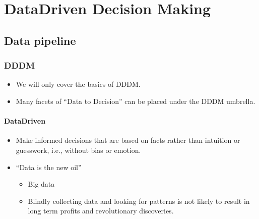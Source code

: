 \documentclass[letterpaper,10pt,english]{jupyterBook}
\begin{document}
\sphinxstepscope


\part{Data\sphinxhyphen{}Driven Decision Making}

\sphinxstepscope


\chapter{Data pipeline}
\label{\detokenize{1_Decision_making/Data_pipeline:data-pipeline}}\label{\detokenize{1_Decision_making/Data_pipeline::doc}}
\sphinxstepscope


\section{DDDM}
\label{\detokenize{1_Decision_making/Decision_making:dddm}}\label{\detokenize{1_Decision_making/Decision_making::doc}}\begin{itemize}
\item {} 
\sphinxAtStartPar
We will only cover the basics of DDDM.

\item {} 
\sphinxAtStartPar
Many facets of “Data to Decision” can be placed under the DDDM umbrella.

\end{itemize}


\subsection{Data\sphinxhyphen{}Driven}
\label{\detokenize{1_Decision_making/Decision_making:data-driven}}\begin{itemize}
\item {} 
\sphinxAtStartPar
Make informed decisions that are based on facts rather than intuition or guesswork, i.e., without bias or emotion.

\item {} 
\sphinxAtStartPar
{} \sphinxhyphen{}“Data is the new oil”
\begin{itemize}
\item {} 
\sphinxAtStartPar
Big data

\item {} 
\sphinxAtStartPar
Blindly collecting data and looking for patterns is not likely to result in long term profits and revolutionary discoveries.

\end{itemize}

\end{itemize}
\end{document}
